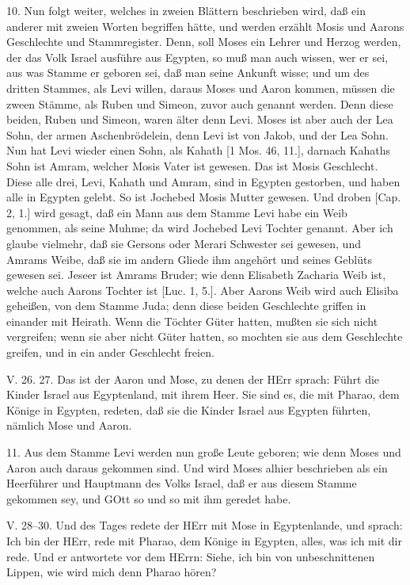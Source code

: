 10. Nun folgt weiter, welches in zweien Blättern beschrieben wird, daß ein anderer mit zweien Worten begriffen hätte, und werden erzählt Mosis und Aarons Geschlechte und Stammregister. Denn, soll Moses ein Lehrer und Herzog werden, der das Volk Israel ausführe aus Egypten, so muß man auch wissen, wer er sei, aus was Stamme er geboren sei, daß man seine Ankunft wisse; und um des dritten Stammes, als Levi willen, daraus Moses und Aaron kommen, müssen die zween Stämme, als Ruben und Simeon, zuvor auch genannt werden. Denn diese beiden, Ruben und Simeon, waren älter denn Levi. Moses ist aber auch der Lea Sohn, der armen Aschenbrödelein, denn Levi ist von Jakob, und der Lea Sohn. Nun hat Levi wieder einen Sohn, als Kahath [1 Mos. 46, 11.], darnach Kahaths Sohn ist Amram, welcher Mosis Vater ist gewesen. Das ist Mosis Geschlecht. Diese alle drei, Levi, Kahath und Amram, sind
in Egypten gestorben, und haben alle in Egypten gelebt. So ist Jochebed Mosis Mutter gewesen. Und droben [Cap. 2, 1.] wird gesagt, daß ein Mann aus dem Stamme Levi habe ein Weib genommen, als seine Muhme; da wird Jochebed Levi Tochter genannt. Aber ich glaube vielmehr, daß sie Gersons oder Merari Schwester sei gewesen, und Amrams Weibe, daß sie im andern Gliede ihm angehört und seines Geblüts gewesen sei. Jeseer ist Amrams Bruder; wie denn Elisabeth Zacharia Weib ist, welche auch Aarons Tochter ist [Luc. 1, 5.]. Aber Aarons Weib wird auch Elisiba geheißen, von dem Stamme Juda; denn diese beiden Geschlechte griffen in einander mit Heirath. Wenn die Töchter Güter hatten, mußten sie sich nicht vergreifen; wenn sie aber nicht Güter hatten, so mochten sie aus dem Geschlechte greifen, und in ein ander Geschlecht freien.

\begin{schriftzitat}
V. 26. 27. Das ist der Aaron und Mose, zu denen der HErr sprach: Führt die Kinder Israel aus Egyptenland, mit ihrem Heer. Sie sind es, die mit Pharao, dem Könige in Egypten, redeten, daß sie die Kinder Israel aus Egypten führten, nämlich Mose und Aaron.
\end{schriftzitat}

11. Aus dem Stamme Levi werden nun große Leute geboren; wie denn Moses und Aaron auch daraus gekommen sind. Und wird Moses alhier beschrieben als ein Heerführer und Hauptmann des Volks Israel, daß er aus diesem Stamme gekommen sey, und GOtt so und so mit ihm geredet habe.

\begin{schriftzitat}
V. 28–30. Und des Tages redete der HErr mit Mose in Egyptenlande, und sprach: Ich bin der HErr, rede mit Pharao, dem Könige in Egypten, alles, was ich mit dir rede. Und er antwortete vor dem HErrn: Siehe, ich bin von unbeschnittenen Lippen, wie wird mich denn Pharao hören?
\end{schriftzitat}

